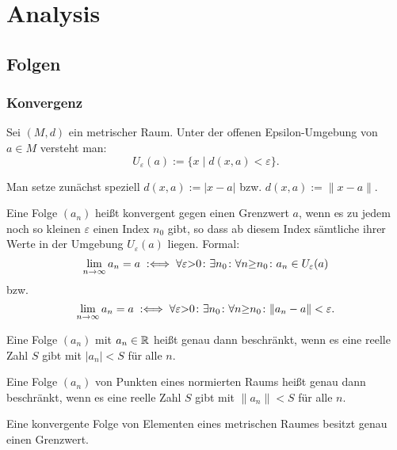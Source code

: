 
\chapter{Analysis}
\section{Folgen}
\subsection{Konvergenz}

\begin{Definition}%
Sei $(M,d)$ ein metrischer Raum. Unter der offenen Epsilon-Umgebung
von $a\in M$ versteht man:%
\[U_\varepsilon(a) := \{x\mid d(x,a)<\varepsilon\}.\]
\end{Definition}

\noindent
Man setze zunächst speziell $d(x,a):=|x-a|$ bzw. $d(x,a):=\|x-a\|$.

\begin{Definition}%
\label{def:lim}\newlinefirst
Eine Folge $(a_n)$ heißt konvergent gegen einen Grenzwert $a$, wenn es
zu jedem noch so kleinen $\varepsilon$ einen Index $n_0$ gibt, so dass
ab diesem Index sämtliche ihrer Werte in der Umgebung
$U_\varepsilon(a)$ liegen. Formal:
\[\lim_{n\to\infty} a_n = a
\;:\Longleftrightarrow\; \forall\varepsilon{>}0\colon\exists n_0\colon\forall n{\ge}n_0\colon a_n\in U_\varepsilon(a)\]
bzw.
\[\lim_{n\to\infty} a_n = a
\;:\Longleftrightarrow\; \forall\varepsilon{>}0\colon\exists n_0\colon\forall n{\ge}n_0\colon \|a_n-a\|<\varepsilon.\]
\end{Definition}

\begin{Definition}%
\label{def:bseq}
Eine Folge $(a_n)$ mit $a_n\in\mathbb R$ heißt genau dann beschränkt,
wenn es eine reelle Zahl $S$ gibt mit $|a_n|<S$ für alle $n$.

Eine Folge $(a_n)$ von Punkten eines normierten Raums heißt genau
dann beschränkt, wenn es eine reelle Zahl $S$ gibt mit $\|a_n\|<S$
für alle $n$.
\end{Definition}

\begin{Satz}\newlinefirst
Eine konvergente Folge von Elementen eines metrischen Raumes
besitzt genau einen Grenzwert.
\end{Satz}

